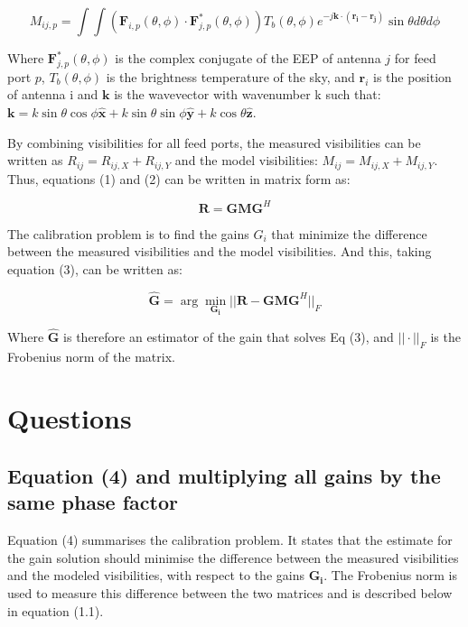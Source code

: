 \documentclass[12pt]{report} %
\begin{document}
\begin{equation}
    M_{ij,p} = \int\int (\mathbf{F}_{i,p}(\theta, \phi) \cdot \mathbf{F}_{j,p}^{*}(\theta, \phi))T_{b}(\theta, \phi)e^{-j\mathbf{k} \cdot (\mathbf{r_{i}}-\mathbf{r_{j}})} \sin\theta d\theta d\phi
\end{equation}

Where $\mathbf{F}_{j,p}^{*}(\theta, \phi)$ is the complex conjugate of the EEP of antenna $j$ for feed port $p$, $T_{b}(\theta, \phi)$ is the brightness temperature of the sky, and $\mathbf{r}_{i}$ is the position of antenna i and $\mathbf{k}$ is the wavevector with wavenumber k such that: $\mathbf{k} = k \sin \theta \cos \phi \mathbf{\hat{x}} + k \sin \theta \sin \phi \mathbf{\hat{y}} + k \cos \theta \mathbf{\hat{z}}$.

By combining visibilities for all feed ports, the measured visibilities can be written as $R_{ij} = R_{ij, X} + R_{ij, Y}$ and the model visibilities: $M_{ij} = M_{ij, X} + M_{ij, Y}$. Thus, equations (1) and (2) can be written in matrix form as:

\begin{equation}
    \mathbf{R} = \mathbf{G} \mathbf{M} \mathbf{G}^H
\end{equation}

The calibration problem is to find the gains $G_{i}$ that minimize the difference between the measured visibilities and the model visibilities. And this, taking equation (3), can be written as:

\begin{equation}
    \mathbf{\hat{G}} = \arg\min_{\mathbf{G_{i}}} ||\mathbf{R} - \mathbf{G} \mathbf{M} \mathbf{G}^H||_{F}
\end{equation}

Where $\mathbf{\hat{G}}$ is therefore an estimator of the gain that solves Eq (3), and $||\cdot||_{F}$ is the Frobenius norm of the matrix.

\chapter{Questions}

\section{Equation (4) and multiplying all gains by the same phase factor}

Equation (4) summarises the calibration problem. It states that the estimate for the gain solution should minimise the difference between the measured visibilities and the modeled visibilities, with respect to the gains $\mathbf{G_{i}}$. The Frobenius norm is used to measure this difference between the two matrices and is described below in equation (1.1)\cite{frobenius}.
\end{document}
